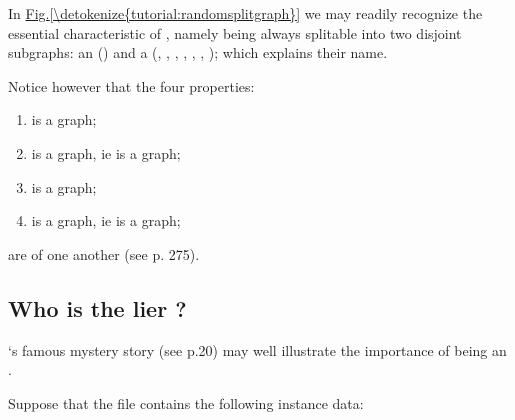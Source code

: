 \documentclass[a4paper,10pt,english]{sphinxhowto}
\begin{document}
In \hyperref[\detokenize{tutorial:randomsplitgraph}]{Fig.\@ \ref{\detokenize{tutorial:randomsplitgraph}}} we may readily recognize the essential characteristic of , namely being always splitable into two disjoint sub\sphinxhyphen{}graphs: an  () and a  (, , , , , , ); which explains their name.

Notice however that the four properties:
\begin{enumerate}
%
\item {} 
 is a  graph;

\item {} 
 is a  graph, ie  is a  graph;

\item {} 
 is a  graph;

\item {} 
 is a  graph, ie  is a  graph;

\end{enumerate}

are  of one another (see  p. 275).


\subsection{Who is the lier ?}
\label{\detokenize{tutorial:who-is-the-lier}}
 ‘s famous mystery story (see  p.20) may well illustrate the importance of being an .

Suppose that the file  contains the following  instance data:
\end{document}
